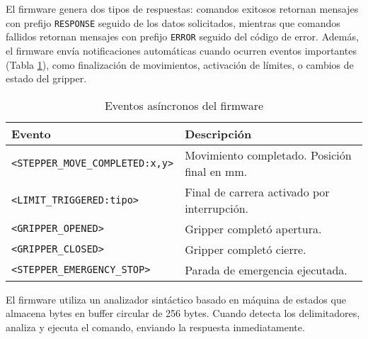 El firmware genera dos tipos de respuestas: comandos exitosos retornan mensajes con prefijo \texttt{RESPONSE} seguido de los datos solicitados, mientras que comandos fallidos retornan mensajes con prefijo \texttt{ERROR} seguido del código de error. Además, el firmware envía notificaciones automáticas cuando ocurren eventos importantes (Tabla \ref{tab:eventos_asincronos}), como finalización de movimientos, activación de límites, o cambios de estado del gripper.

\begin{table}[H]
\centering
\begin{tabular}{|l|p{8cm}|}
\hline
\textbf{Evento} & \textbf{Descripción} \\
\hline
\texttt{<STEPPER\_MOVE\_COMPLETED:x,y>} & Movimiento completado. Posición final en mm. \\
\hline
\texttt{<LIMIT\_TRIGGERED:tipo>} & Final de carrera activado por interrupción. \\
\hline
\texttt{<GRIPPER\_OPENED>} & Gripper completó apertura. \\
\hline
\texttt{<GRIPPER\_CLOSED>} & Gripper completó cierre. \\
\hline
\texttt{<STEPPER\_EMERGENCY\_STOP>} & Parada de emergencia ejecutada. \\
\hline
\end{tabular}
\caption{Eventos asíncronos del firmware}
\label{tab:eventos_asincronos}
\end{table}

El firmware utiliza un analizador sintáctico basado en máquina de estados que almacena bytes en buffer circular de 256 bytes. Cuando detecta los delimitadores, analiza y ejecuta el comando, enviando la respuesta inmediatamente.
